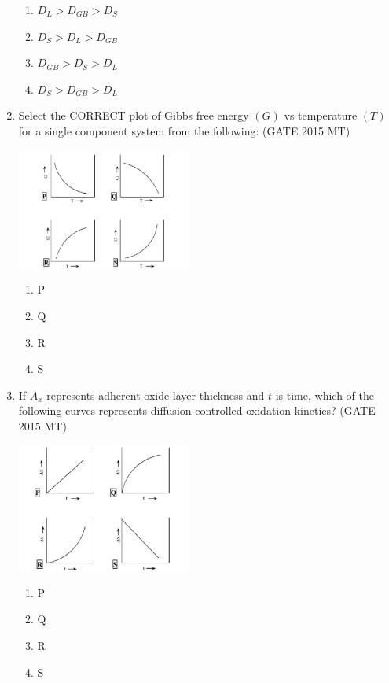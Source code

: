 \documentclass[12pt]{article}
\begin{document}
\begin{enumerate}
\vspace{0.5em}
\begin{enumerate}[label=(\alph*)]
    \item $D_L > D_{GB} > D_S$
    \item $D_S > D_L > D_{GB}$
    \item $D_{GB} > D_S > D_L$
    \item $D_S > D_{GB} > D_L$
\end{enumerate}
\vspace{0.5em}

\item Select the CORRECT plot of Gibbs free energy $(G)$ vs temperature $(T)$ for a single component system from the following: (GATE 2015 MT)

\vspace{0.5em}
\begin{center}
    \includegraphics[width=0.45\textwidth]{images/q21i.jpg}
\end{center}
\begin{enumerate}[label=(\alph*)]
    \item P
    \item Q
    \item R
    \item S
\end{enumerate}
\vspace{0.5em}

\item If $A_x$ represents adherent oxide layer thickness and $t$ is time, which of the following curves represents diffusion-controlled oxidation kinetics? (GATE 2015 MT)

\vspace{0.5em}
\begin{center}
    \includegraphics[width=0.45\textwidth]{images/q22i.jpg}
\end{center}
\begin{enumerate}[label=(\alph*)]
    \item P
    \item Q
    \item R
    \item S
\end{enumerate}
\vspace{0.5em}


\end{enumerate}
\end{document}
